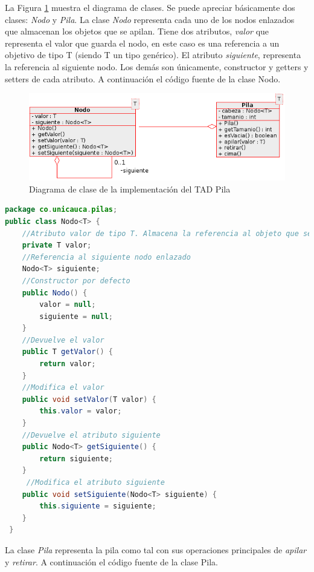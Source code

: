 La Figura \ref{fig:pila-diagrama-clases} muestra el diagrama de clases. Se puede apreciar básicamente dos clases: \textit{Nodo} y \textit{Pila}. La clase \textit{Nodo} representa cada uno de los nodos enlazados que almacenan los objetos que se apilan. Tiene dos atributos,  \textsl{valor} que representa el valor que guarda el nodo, en este caso es una referencia a un objetivo de tipo T (siendo T un tipo genérico). El atributo \textsl{siguiente}, representa la referencia al siguiente nodo. Los demás son únicamente, constructor y getters y setters de cada atributo. A continuación el código fuente de la clase Nodo.


\begin{figure}
	\centering
		\includegraphics{Diagramas/DiagramaClases-Pila}
	\caption{Diagrama de clase de la implementación del TAD Pila}	
	\label{fig:pila-diagrama-clases}
\end{figure}

\begin{lstlisting}[language=Java]
package co.unicauca.pilas;
public class Nodo<T> {
	//Atributo valor de tipo T. Almacena la referencia al objeto que se guarda en el nodo
 	private T valor;
 	//Referencia al siguiente nodo enlazado
 	Nodo<T> siguiente;
	//Constructor por defecto
 	public Nodo() {
 		valor = null;
 		siguiente = null;
 	}
	//Devuelve el valor 
 	public T getValor() {
 		return valor;
 	}
	//Modifica el valor
 	public void setValor(T valor) {
 		this.valor = valor;
 	}
	//Devuelve el atributo siguiente
 	public Nodo<T> getSiguiente() {
 		return siguiente;
 	}
	 //Modifica el atributo siguiente
 	public void setSiguiente(Nodo<T> siguiente) {
 		this.siguiente = siguiente;
 	}
 }
\end{lstlisting}

La clase \textit{Pila} representa la pila como tal con sus operaciones principales de \textsl{apilar} y \textsl{retirar}. A continuación el código fuente de la clase Pila.

